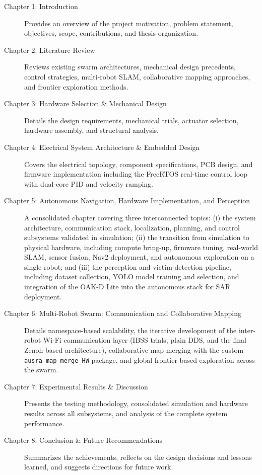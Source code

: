 \begin{description}
    \item[Chapter 1: Introduction] Provides an overview of the project motivation, problem statement, objectives, scope, contributions, and thesis organization.

    \item[Chapter 2: Literature Review] Reviews existing swarm architectures, mechanical design precedents, control strategies, multi-robot SLAM, collaborative mapping approaches, and frontier exploration methods.

    \item[Chapter 3: Hardware Selection \& Mechanical Design] Details the design requirements, mechanical trials, actuator selection, hardware assembly, and structural analysis.

    \item[Chapter 4: Electrical System Architecture \& Embedded Design] Covers the electrical topology, component specifications, PCB design, and firmware implementation including the FreeRTOS real-time control loop with dual-core PID and velocity ramping.

    \item[Chapter 5: Autonomous Navigation, Hardware Implementation, and Perception] A consolidated chapter covering three interconnected topics: (i) the system architecture, communication stack, localization, planning, and control subsystems validated in simulation; (ii) the transition from simulation to physical hardware, including compute bring-up, firmware tuning, real-world SLAM, sensor fusion, Nav2 deployment, and autonomous exploration on a single robot; and (iii) the perception and victim-detection pipeline, including dataset collection, YOLO model training and selection, and integration of the OAK-D Lite into the autonomous stack for SAR deployment.

    \item[Chapter 6: Multi-Robot Swarm: Communication and Collaborative Mapping] Details namespace-based scalability, the iterative development of the inter-robot Wi-Fi communication layer (IBSS trials, plain DDS, and the final Zenoh-based architecture), collaborative map merging with the custom \texttt{ausra\_map\_merge\_HW} package, and global frontier-based exploration across the swarm.

    \item[Chapter 7: Experimental Results \& Discussion] Presents the testing methodology, consolidated simulation and hardware results across all subsystems, and analysis of the complete system performance.

    \item[Chapter 8: Conclusion \& Future Recommendations] Summarizes the achievements, reflects on the design decisions and lessons learned, and suggests directions for future work.
\end{description}



